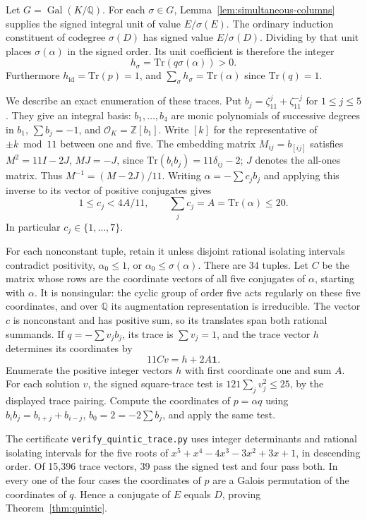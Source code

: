 \documentclass[11pt,a4paper]{article}
\numberwithin{equation}{section}
\begin{document}
Let $G=\operatorname{Gal}(K/\mathbb Q)$. For each $\sigma\in G$,
Lemma~\ref{lem:simultaneous-columns} supplies the signed integral unit
of value $E/\sigma(E)$. The ordinary induction constituent of codegree
$\sigma(D)$ has signed value $E/\sigma(D)$. Dividing by that unit places
$\sigma(\alpha)$ in the signed order. Its unit coefficient is therefore the integer
\[
  h_\sigma=\mathrm{Tr}(q\sigma(\alpha))>0 .
\]
Furthermore $h_{\mathrm{id}}=\mathrm{Tr}(p)=1$, and $\sum_\sigma h_\sigma=\mathrm{Tr}(\alpha)$ since $\mathrm{Tr}(q)=1$.

We describe an exact enumeration of these traces. Put $b_j=\zeta_{11}^j+\zeta_{11}^{-j}$ for $1\le j\le5$. They give an integral basis: $b_1,\ldots,b_4$ are monic polynomials of successive degrees in $b_1$, $\sum b_j=-1$, and $\mathcal O_K=\mathbb Z[b_1]$. Write $[k]$ for the representative of $\pm k\bmod 11$ between one and five. The embedding matrix $M_{ij}=b_{[ij]}$ satisfies $M^2=11I-2J$, $MJ=-J$, since $\mathrm{Tr}(b_i b_j)=11\delta_{ij}-2$; $J$ denotes the all-ones matrix. Thus $M^{-1}=(M-2J)/11$. Writing $\alpha=-\sum c_j b_j$ and applying this inverse to its vector of positive conjugates gives
\[
   1\le c_j<4A/11,\qquad \sum_j c_j=A=\mathrm{Tr}(\alpha)\le20.
\]
In particular $c_j\in\{1,\ldots,7\}$.

For each nonconstant tuple, retain it unless disjoint rational isolating intervals contradict positivity, $\alpha_0\le1$, or $\alpha_0\le\sigma(\alpha)$. There are 34 tuples. Let $C$ be the matrix whose rows are the coordinate vectors of all five conjugates of $\alpha$, starting with $\alpha$. It is nonsingular: the cyclic group of order five acts regularly on these five coordinates, and over $\mathbb Q$ its augmentation representation is irreducible. The vector $c$ is nonconstant and has positive sum, so its translates span both rational summands. If $q=-\sum v_jb_j$, its trace is $\sum v_j=1$, and the trace vector $h$ determines its coordinates by
\[
   11Cv=h+2A\mathbf1 .
\]
Enumerate the positive integer vectors $h$ with first coordinate one and sum $A$. For each solution $v$, the signed square-trace test is $121\sum_jv_j^2\le25$, by the displayed trace pairing. Compute the coordinates of $p=\alpha q$ using $b_i b_j=b_{i+j}+b_{i-j}$, $b_0=2=-2\sum b_j$, and apply the same test.

The certificate \texttt{verify\_quintic\_trace.py} uses integer determinants and rational isolating intervals for the five roots of $x^5+x^4-4x^3-3x^2+3x+1$, in descending order. Of 15,396 trace vectors, 39 pass the signed test and four pass both. In every one of the four cases the coordinates of $p$ are a Galois permutation of the coordinates of $q$. Hence a conjugate of $E$ equals $D$, proving Theorem~\ref{thm:quintic}.
\end{document}
